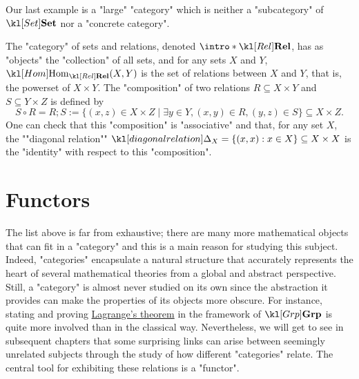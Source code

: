 \documentclass[main.tex]{subfiles}
\begin{document}
Our last example is a "large" "category" which is neither a "subcategory" of $\catSet$ nor a "concrete category".
\begin{exmp}[$\catRel$]\label{exmp:catRel}
    \AP The "category" of sets and relations, denoted $\intro*\catRel$, has as "objects" the "collection" of all sets, and for any sets $X$ and $Y$, $\Hom_{\catRel}(X,Y)$ is the set of relations between $X$ and $Y$, that is, the powerset of $X\times Y$. The "composition" of two relations $R \subseteq X\times Y$ and $S \subseteq Y\times Z$ is defined by
    \[S\circ R = R;S := \{(x,z) \in X\times Z \mid \exists y \in Y, (x,y) \in R, (y,z) \in S\} \subseteq X \times Z.\]
    \AP One can check that this "composition" is "associative" and that, for any set $X$, the ""diagonal relation"" $\diagRel_X = \{(x,x) : x \in X\} \subseteq X \times X$ is the "identity" with respect to this "composition".
\end{exmp}

\section{Functors}
The list above is far from exhaustive; there are many more mathematical objects that can fit in a "category" and this is a main reason for studying this subject. Indeed, "categories" encapsulate a natural structure that accurately represents the heart of several mathematical theories from a global and abstract perspective. Still, a "category" is almost never studied on its own since the abstraction it provides can make the properties of its objects more obscure. For instance, stating and proving \href{https://en.wikipedia.org/wiki/Lagrange%27s_theorem_(group_theory)}{Lagrange's theorem} in the framework of $\catGrp$ is quite more involved than in the classical way. Nevertheless, we will get to see in subsequent chapters that some surprising links can arise between seemingly unrelated subjects through the study of how different "categories" relate. The central tool for exhibiting these relations is a "functor".%
\end{document}
